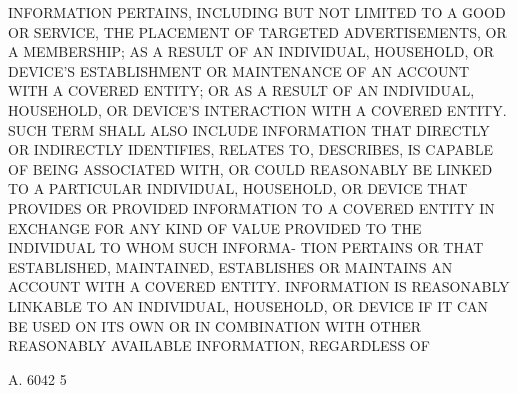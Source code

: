  INFORMATION PERTAINS, INCLUDING BUT NOT LIMITED TO A  GOOD  OR  SERVICE,
 THE  PLACEMENT  OF TARGETED ADVERTISEMENTS, OR A MEMBERSHIP; AS A RESULT
 OF AN INDIVIDUAL, HOUSEHOLD, OR DEVICE'S ESTABLISHMENT OR MAINTENANCE OF
 AN ACCOUNT WITH A COVERED ENTITY; OR  AS  A  RESULT  OF  AN  INDIVIDUAL,
 HOUSEHOLD,  OR  DEVICE'S  INTERACTION  WITH  A COVERED ENTITY. SUCH TERM
 SHALL ALSO INCLUDE INFORMATION THAT DIRECTLY OR  INDIRECTLY  IDENTIFIES,
 RELATES  TO,  DESCRIBES,  IS  CAPABLE OF BEING ASSOCIATED WITH, OR COULD
 REASONABLY BE LINKED TO A PARTICULAR INDIVIDUAL,  HOUSEHOLD,  OR  DEVICE
 THAT  PROVIDES  OR  PROVIDED INFORMATION TO A COVERED ENTITY IN EXCHANGE
 FOR ANY KIND OF VALUE PROVIDED TO THE INDIVIDUAL TO WHOM  SUCH  INFORMA-
 TION  PERTAINS OR THAT ESTABLISHED, MAINTAINED, ESTABLISHES OR MAINTAINS
 AN ACCOUNT WITH A COVERED ENTITY. INFORMATION IS REASONABLY LINKABLE  TO
 AN  INDIVIDUAL,  HOUSEHOLD, OR DEVICE IF IT CAN BE USED ON ITS OWN OR IN
 COMBINATION WITH OTHER REASONABLY AVAILABLE INFORMATION,  REGARDLESS  OF

 A. 6042                             5
 
